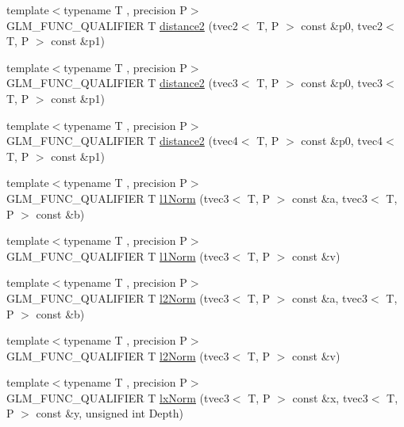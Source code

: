 \begin{DoxyCompactItemize}
\item 
{\footnotesize template$<$typename T , precision P$>$ }\\G\+L\+M\+\_\+\+F\+U\+N\+C\+\_\+\+Q\+U\+A\+L\+I\+F\+I\+E\+R T \hyperlink{namespaceglm_a96912f40056fa526cc78cbed19ef2a78}{distance2} (tvec2$<$ T, P $>$ const \&p0, tvec2$<$ T, P $>$ const \&p1)
\item 
{\footnotesize template$<$typename T , precision P$>$ }\\G\+L\+M\+\_\+\+F\+U\+N\+C\+\_\+\+Q\+U\+A\+L\+I\+F\+I\+E\+R T \hyperlink{namespaceglm_a077e15621363b18b4366bc24701c6460}{distance2} (tvec3$<$ T, P $>$ const \&p0, tvec3$<$ T, P $>$ const \&p1)
\item 
{\footnotesize template$<$typename T , precision P$>$ }\\G\+L\+M\+\_\+\+F\+U\+N\+C\+\_\+\+Q\+U\+A\+L\+I\+F\+I\+E\+R T \hyperlink{namespaceglm_a2d7dc34ce8ec9c16e32470833b3b1c35}{distance2} (tvec4$<$ T, P $>$ const \&p0, tvec4$<$ T, P $>$ const \&p1)
\item 
{\footnotesize template$<$typename T , precision P$>$ }\\G\+L\+M\+\_\+\+F\+U\+N\+C\+\_\+\+Q\+U\+A\+L\+I\+F\+I\+E\+R T \hyperlink{group__gtx__norm_gaebe5a39b06e262e615622129f37da4f4}{l1\+Norm} (tvec3$<$ T, P $>$ const \&a, tvec3$<$ T, P $>$ const \&b)
\item 
{\footnotesize template$<$typename T , precision P$>$ }\\G\+L\+M\+\_\+\+F\+U\+N\+C\+\_\+\+Q\+U\+A\+L\+I\+F\+I\+E\+R T \hyperlink{group__gtx__norm_ga6d5964f09cdb43803496a5ee3ced71cb}{l1\+Norm} (tvec3$<$ T, P $>$ const \&v)
\item 
{\footnotesize template$<$typename T , precision P$>$ }\\G\+L\+M\+\_\+\+F\+U\+N\+C\+\_\+\+Q\+U\+A\+L\+I\+F\+I\+E\+R T \hyperlink{group__gtx__norm_gafa6fbbc99cd44d81bf030e74eaf7ad64}{l2\+Norm} (tvec3$<$ T, P $>$ const \&a, tvec3$<$ T, P $>$ const \&b)
\item 
{\footnotesize template$<$typename T , precision P$>$ }\\G\+L\+M\+\_\+\+F\+U\+N\+C\+\_\+\+Q\+U\+A\+L\+I\+F\+I\+E\+R T \hyperlink{group__gtx__norm_ga0a8cb8a0ce88d1d977de23209bf04610}{l2\+Norm} (tvec3$<$ T, P $>$ const \&v)
\item 
{\footnotesize template$<$typename T , precision P$>$ }\\G\+L\+M\+\_\+\+F\+U\+N\+C\+\_\+\+Q\+U\+A\+L\+I\+F\+I\+E\+R T \hyperlink{group__gtx__norm_ga932bb0854e5c5a6ab5a14b023c451ca7}{lx\+Norm} (tvec3$<$ T, P $>$ const \&x, tvec3$<$ T, P $>$ const \&y, unsigned int Depth)

\end{DoxyCompactItemize}
